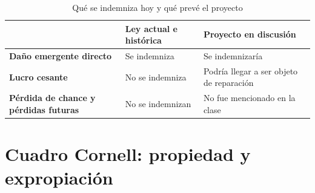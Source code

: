 \documentclass[12pt,oneside]{book}
\begin{document}
\begin{table}[H]
\centering
\renewcommand{\arraystretch}{1.3}
\begin{tabularx}{\textwidth}{
    >{\raggedright\arraybackslash}p{}
    >{\raggedright\arraybackslash}X
    >{\raggedright\arraybackslash}X
}
\toprule
 & \textbf{Ley actual e histórica} & \textbf{Proyecto en discusión} \\
\midrule
\textbf{Daño emergente directo} & Se indemniza & Se indemnizaría \\
\textbf{Lucro cesante} & No se indemniza & Podría llegar a ser objeto de reparación \\
\textbf{Pérdida de chance y pérdidas futuras} & No se indemnizan & No fue mencionado en la clase \\
\bottomrule
\end{tabularx}
\caption{Qué se indemniza hoy y qué prevé el proyecto}
\end{table}

\section{Cuadro Cornell: propiedad y expropiación}
\end{document}
